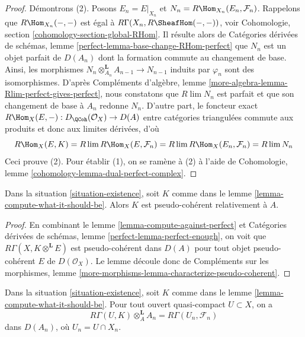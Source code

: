 \begin{proof}
Démontrons (2). Posons $E_n = E|_{X_n}$ et
$N_n = R\Hom_{X_n}(E_n, \mathcal{F}_n)$.
Rappelons que $R\Hom_{X_n}(-, -)$ est égal à
$R\Gamma(X_n, R\SheafHom(-, -))$, voir
Cohomologie, section \ref{cohomology-section-global-RHom}.
Il résulte alors de Catégories dérivées de schémas, lemme
\ref{perfect-lemma-base-change-RHom-perfect}
que $N_n$ est un objet parfait de $D(A_n)$
dont la formation commute au changement de base. Ainsi, les morphismes
$N_n \otimes_{A_n}^\mathbf{L} A_{n - 1} \to N_{n - 1}$
induits par $\varphi_n$ sont des isomorphismes.
D'après Compléments d'algèbre, lemme \ref{more-algebra-lemma-Rlim-perfect-gives-perfect}, nous constatons que
$R\lim N_n$ est parfait et
que son changement de base à $A_n$ redonne $N_n$.
D'autre part, le foncteur exact
$R\Hom_X(E, -) : D_\QCoh(\mathcal{O}_X) \to D(A)$
entre catégories triangulées commute aux produits
et donc aux limites dérivées, d'où
$$
R\Hom_X(E, K) =
R\lim R\Hom_X(E, \mathcal{F}_n) =
R\lim R\Hom_X(E_n, \mathcal{F}_n) =
R\lim N_n
$$
Ceci prouve (2). Pour établir (1), on se ramène à (2)
à l'aide de Cohomologie, lemme \ref{cohomology-lemma-dual-perfect-complex}.
\end{proof}

\begin{lemma}
\label{lemma-relative-pseudo-coherence}
Dans la situation \ref{situation-existence}, soit $K$ comme dans le
lemme \ref{lemma-compute-what-it-should-be}. Alors $K$
est pseudo-cohérent relativement à $A$.
\end{lemma}

\begin{proof}
En combinant le lemme \ref{lemma-compute-against-perfect} et
Catégories dérivées de schémas, lemme \ref{perfect-lemma-perfect-enough},
on voit que $R\Gamma(X, K \otimes^\mathbf{L} E)$
est pseudo-cohérent dans $D(A)$ pour tout objet pseudo-cohérent
$E$ de $D(\mathcal{O}_X)$. Le lemme découle donc de
Compléments sur les morphismes, lemme
\ref{more-morphisms-lemma-characterize-pseudo-coherent}.
\end{proof}

\begin{lemma}
\label{lemma-compute-over-affine}
Dans la situation \ref{situation-existence}, soit $K$ comme dans le
lemme \ref{lemma-compute-what-it-should-be}. Pour tout
ouvert quasi-compact $U \subset X$, on a
$$
R\Gamma(U, K) \otimes_A^\mathbf{L} A_n =
R\Gamma(U_n, \mathcal{F}_n)
$$
dans $D(A_n)$, où $U_n = U \cap X_n$.
\end{lemma}

